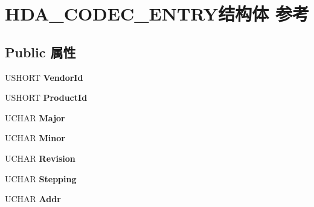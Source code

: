 \hypertarget{struct_h_d_a___c_o_d_e_c___e_n_t_r_y}{}\section{H\+D\+A\+\_\+\+C\+O\+D\+E\+C\+\_\+\+E\+N\+T\+R\+Y结构体 参考}
\label{struct_h_d_a___c_o_d_e_c___e_n_t_r_y}
\subsection*{Public 属性}
\begin{DoxyCompactItemize}
\item 
\mbox{\label{struct_h_d_a___c_o_d_e_c___e_n_t_r_y_a7c2f3fba6de096ed62aeefd8a8684e25}} 
U\+S\+H\+O\+RT {\bfseries Vendor\+Id}
\item 
\mbox{\label{struct_h_d_a___c_o_d_e_c___e_n_t_r_y_a63bfbe90e76296ef7a1167bb057e95f5}} 
U\+S\+H\+O\+RT {\bfseries Product\+Id}
\item 
\mbox{\label{struct_h_d_a___c_o_d_e_c___e_n_t_r_y_a71cae9e682f562af97f44721dcd52f59}} 
U\+C\+H\+AR {\bfseries Major}
\item 
\mbox{\label{struct_h_d_a___c_o_d_e_c___e_n_t_r_y_aaf9e53c081c302ee9faf106a4d740a7c}} 
U\+C\+H\+AR {\bfseries Minor}
\item 
\mbox{\label{struct_h_d_a___c_o_d_e_c___e_n_t_r_y_a1ec3f01c84f7fb17dcb5d6a0cbb776f1}} 
U\+C\+H\+AR {\bfseries Revision}
\item 
\mbox{\label{struct_h_d_a___c_o_d_e_c___e_n_t_r_y_a265c238121b3ff2854dc68118a6afe7b}} 
U\+C\+H\+AR {\bfseries Stepping}
\item 
\mbox{\label{struct_h_d_a___c_o_d_e_c___e_n_t_r_y_af02b00c05789756dbf0d32be4a42e4ce}} 
U\+C\+H\+AR {\bfseries Addr}
\item 
\mbox{\label{struct_h_d_a___c_o_d_e_c___e_n_t_r_y_a5d2f75dd129be2d7d1a7de13f852716d}} 

\end{DoxyCompactItemize}
